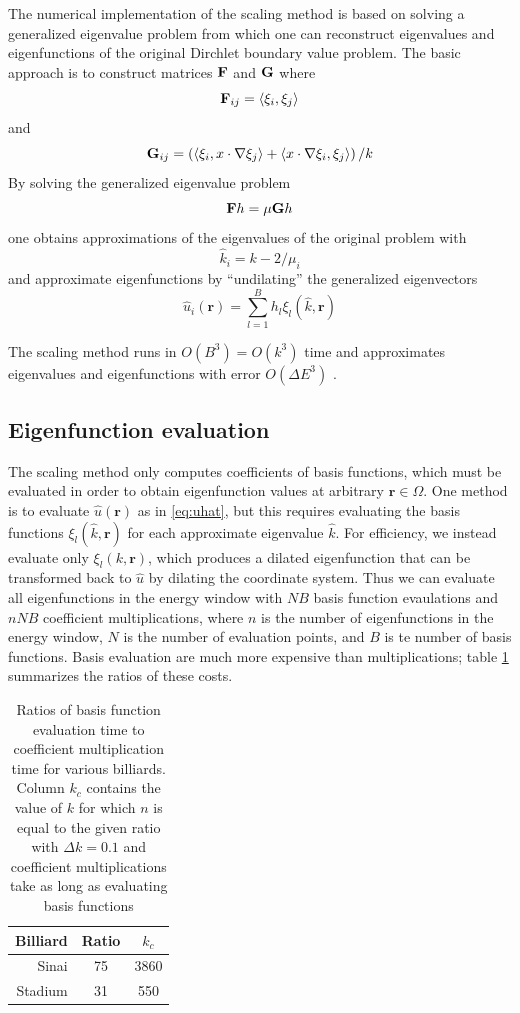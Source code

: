 \documentclass{report}
\newcommand{\rr}[0]{\mathbf{r}}
\begin{document}
The numerical implementation of the scaling method is based on solving a generalized eigenvalue problem from which one can reconstruct eigenvalues and eigenfunctions of the original Dirchlet boundary value problem. The basic approach is to construct matrices ${\bf F}$ and ${\bf G}$ where
\[
{\bf F}_{ij} = \langle \xi_{i}, \xi_{j} \rangle
\] 
and
\[
{\bf G}_{ij} = \left( \langle \xi_{i}, x \cdot \nabla \xi_{j} \rangle + \langle x \cdot \nabla \xi_{i}, \xi_{j} \rangle \right) / k
\]
By solving the generalized eigenvalue problem
\[
{\bf F} h = \mu {\bf G} h
\]
one obtains approximations of the eigenvalues of the original problem with
\[
\hat{k}_{i} = k - 2/\mu_{i}
\]
and approximate eigenfunctions by ``undilating'' the generalized eigenvectors
\begin{equation}
  \label{eq:uhat}
  \hat{u}_{i}(\rr) = \sum_{l=1}^{B} h_{l} \xi_{l}(\hat{k}, \rr)
\end{equation}

The scaling method runs in $O(B^{3}) = O(k^{3})$ time \cite{barnett} and approximates eigenvalues and eigenfunctions with error $O({\Delta E}^{3})$ \cite[p. 32]{barnett_hassell}.

\subsection{Eigenfunction evaluation}
The scaling method only computes coefficients of basis functions, which must be evaluated in order to obtain eigenfunction values at arbitrary $\rr \in \Omega$. One method is to evaluate $\hat{u}(\rr)$ as in \ref{eq:uhat}, but this requires evaluating the basis functions $\xi_{l}(\hat{k}, \rr)$ for each approximate eigenvalue $\hat{k}$. For efficiency, we instead evaluate only $\xi_{l}(k, \rr)$, which produces a dilated eigenfunction that can be transformed back to $\hat{u}$ by dilating the coordinate system. Thus we can evaluate all eigenfunctions in the energy window with $NB$ basis function evaulations and $nNB$ coefficient multiplications, where $n$ is the number of eigenfunctions in the energy window, $N$ is the number of evaluation points, and $B$ is te number of basis functions. Basis evaluation are much more expensive than multiplications; table \ref{tab:eval_ratios} summarizes the ratios of these costs.

\begin{table}
  \centering
  \begin{tabular}{|r|c|c|}
    \hline
    Billiard & Ratio & $k_c$ \\ \hline
    \hline
    Sinai & 75 & 3860 \\ \hline
    Stadium & 31 & 550 \\
    \hline
  \end{tabular}
  \caption{Ratios of basis function evaluation time to coefficient multiplication time for various billiards. Column $k_c$ contains the value of $k$ for which $n$ is equal to the given ratio with $\Delta k = 0.1$ and coefficient multiplications take as long as evaluating basis functions}
  \label{tab:eval_ratios}
\end{table}
\end{document}
